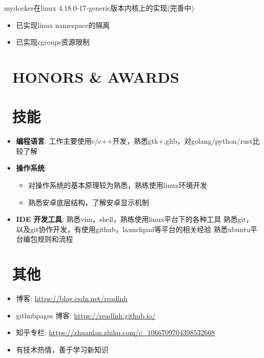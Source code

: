 \documentclass{resume}
\begin{document}
mydocker在linux 4.18.0-17-generic版本内核上的实现(完善中)
\begin{itemize}
  \item 已实现linux namespace的隔离
  \item 已实现cgroups资源限制
\end{itemize}

\section{\faHeartO\ HONORS & AWARDS}

\section{\faCogs\ 技能}
\begin{itemize}[parsep=0.25ex]
  \item \textbf{编程语言}:
    工作主要使用c/c++开发，熟悉gtk+,glib，对golang/python/rust比较了解

  \item \textbf{操作系统}:
    \begin{itemize}
      \item  对操作系统的基本原理较为熟悉，熟练使用linux环境开发
      \item  熟悉安卓底层结构，了解安卓显示机制
    \end{itemize}

  \item \textbf{IDE 开发工具}:
    熟悉vim，shell，熟练使用linux平台下的各种工具
    熟悉git，以及git协作开发，有使用github，launchpad等平台的相关经验
    熟悉ubuntu平台编包规则和流程

\end{itemize}


\section{\faInfo\ 其他}
\begin{itemize}[parsep=0.25ex]
  \item 博客: \url{https://blog.csdn.net/readlnh}
  \item githubpages 博客: \url{https://readlnh.github.io/}
  \item 知乎专栏: \url{https://zhuanlan.zhihu.com/c_1066709704398532608}
  \item 有技术热情，善于学习新知识
\end{itemize}

%
%
\end{document}
